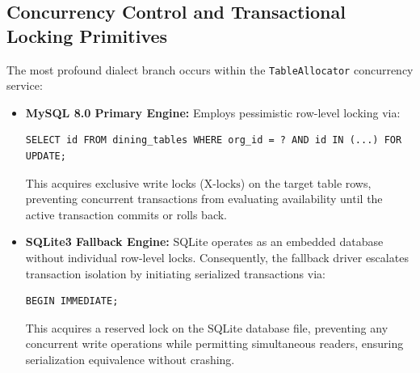 \subsection{Concurrency Control and Transactional Locking Primitives}
The most profound dialect branch occurs within the \texttt{TableAllocator} concurrency service:
\begin{itemize}
    \item \textbf{MySQL 8.0 Primary Engine:} Employs pessimistic row-level locking via:
    \begin{lstlisting}[language=SQLANSI]
    SELECT id FROM dining_tables WHERE org_id = ? AND id IN (...) FOR UPDATE;
    \end{lstlisting}
    This acquires exclusive write locks ($\text{X-locks}$) on the target table rows, preventing concurrent transactions from evaluating availability until the active transaction commits or rolls back.
    \item \textbf{SQLite3 Fallback Engine:} SQLite operates as an embedded database without individual row-level locks. Consequently, the fallback driver escalates transaction isolation by initiating serialized transactions via:
    \begin{lstlisting}[language=SQLANSI]
    BEGIN IMMEDIATE;
    \end{lstlisting}
    This acquires a reserved lock on the SQLite database file, preventing any concurrent write operations while permitting simultaneous readers, ensuring serialization equivalence without crashing.
\end{itemize}
